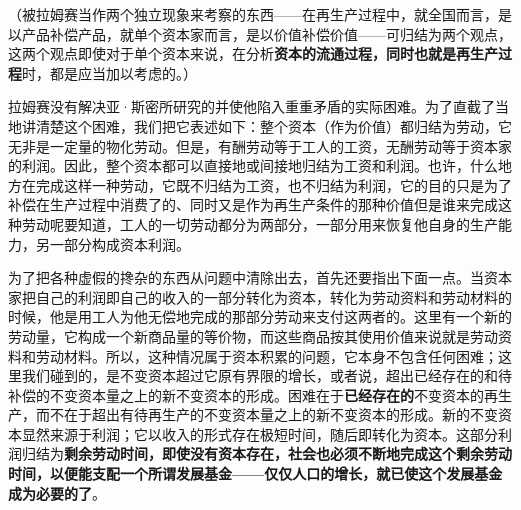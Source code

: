 （被拉姆赛当作两个独立现象来考察的东西——在再生产过程中，就全国而言，是以产品补偿产品，就单个资本家而言，是以价值补偿价值——可归结为两个观点，这两个观点即使对于单个资本来说，在分析\textbf{资本的流通过程，同时也就是再生产过程}时，都是应当加以考虑的。）

拉姆赛没有解决亚·斯密所研究的并使他陷入重重矛盾的实际困难。为了直截了当地讲清楚这个困难，我们把它表述如下：整个资本（作为价值）都归结为劳动，它无非是一定量的物化劳动。但是，有酬劳动等于工人的工资，无酬劳动等于资本家的利润。因此，整个资本都可以直接地或间接地归结为工资和利润。也许，什么地方在完成这样一种劳动，它既不归结为工资，也不归结为利润，它的目的只是为了补偿在生产过程中消费了的、同时又是作为再生产条件的那种价值但是谁来完成这种劳动呢要知道，工人的一切劳动都分为两部分，一部分用来恢复他自身的生产能力，另一部分构成资本利润。



为了把各种虚假的搀杂的东西从问题中清除出去，首先还要指出下面一点。当资本家把自己的利润即自己的收入的一部分转化为资本，转化为劳动资料和劳动材料的时候，他是用工人为他无偿地完成的那部分劳动来支付这两者的。这里有一个新的劳动量，它构成一个新商品量的等价物，而这些商品按其使用价值来说就是劳动资料和劳动材料。所以，这种情况属于资本积累的问题，它本身不包含任何困难；这里我们碰到的，是不变资本超过它原有界限的增长，或者说，超出已经存在的和待补偿的不变资本量之上的新不变资本的形成。困难在于\textbf{已经存在的}不变资本的再生产，而不在于超出有待再生产的不变资本量之上的新不变资本的形成。新的不变资本显然来源于利润；它以收入的形式存在极短时间，随后即转化为资本。这部分利润归结为\textbf{剩余劳动时间，即使没有资本存在，社会也必须不断地完成这个剩余劳动时间，以便能支配一个所谓发展基金——仅仅人口的增长，就已使这个发展基金成为必要的了}。

